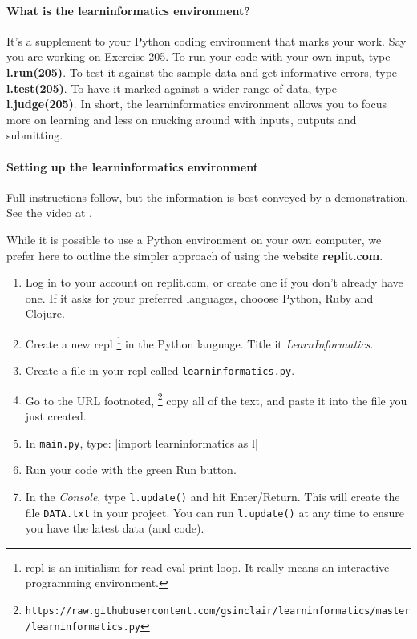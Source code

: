 \paragraph{What is the \textbf{learninformatics} environment?} It's a supplement to your
Python coding environment that marks your work. Say you are working on Exercise 205. To
run your code with your own input, type \textbf{l.run(205)}. To test it against the sample
data and get informative errors, type \textbf{l.test(205)}. To have it marked against a
wider range of data, type \textbf{l.judge(205)}. In short, the learninformatics
environment allows you to focus more on learning and less on mucking around with inputs,
outputs and submitting.

\paragraph{Setting up the learninformatics environment} Full instructions follow, but the
information is best conveyed by a demonstration. See the video at .

While it is possible to use a Python environment on your own computer, we prefer here to
outline the simpler approach of using the website \textbf{replit.com}.

\begin{enumerate}
  \item Log in to your account on replit.com, or create one if you don't already have one.
    If it asks for your preferred languages, chooose Python, Ruby and Clojure.
  \item Create a new repl%
\footnote{repl is an initialism for read-eval-print-loop. It really means an interactive
  programming environment.}
    in the Python language. Title it \emph{LearnInformatics}.
  \item Create a file in your repl called \texttt{learninformatics.py}.
  \item Go to the URL footnoted,%
\footnote{\texttt{https://raw.githubusercontent.com/gsinclair/learninformatics/master/learninformatics.py}}
    copy all of the text, and paste it into the file you just created.
  \item In \texttt{main.py}, type: \pycode|import learninformatics as l|
  \item Run your code with the green Run button.
  \item In the \emph{Console}, type \texttt{l.update()} and hit Enter/Return. This will
    create the file \texttt{DATA.txt} in your project. You can run \texttt{l.update()} at
    any time to ensure you have the latest data (and code).
\end{enumerate}

